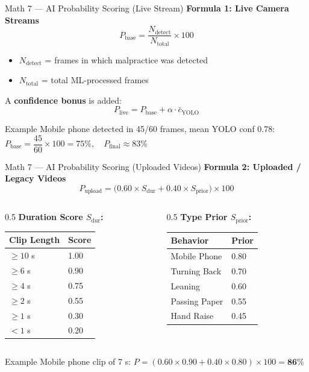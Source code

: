 \documentclass{beamer}
\begin{document}
\begin{frame}{Math 7 --- AI Probability Scoring (Live Stream)}
\textbf{Formula 1: Live Camera Streams}
\[ P_{\text{base}} = \frac{N_{\text{detect}}}{N_{\text{total}}} \times 100 \]
\begin{itemize}
    \item $N_{\text{detect}}$ = frames in which malpractice was detected
    \item $N_{\text{total}}$ = total ML-processed frames
\end{itemize}
A \textbf{confidence bonus} is added:
\[ \boxed{P_{\text{live}} = P_{\text{base}} + \alpha \cdot \bar{c}_{\text{YOLO}}} \]
\begin{exampleblock}{Example}
Mobile phone detected in 45/60 frames, mean YOLO conf 0.78:\\
$P_{\text{base}} = \dfrac{45}{60} \times 100 = 75\%,\quad P_{\text{final}} \approx 83\%$
\end{exampleblock}
\end{frame}

\begin{frame}{Math 7 --- AI Probability Scoring (Uploaded Videos)}
\textbf{Formula 2: Uploaded / Legacy Videos}
\[ \boxed{P_{\text{upload}} = \bigl(0.60\times S_{\text{dur}} + 0.40\times S_{\text{prior}}\bigr)\times 100} \]
\begin{columns}
\begin{column}{0.5\textwidth}
\footnotesize \textbf{Duration Score $S_{\text{dur}}$:}
\begin{tabular}{ll}
\toprule
Clip Length & Score \\ \midrule
$\geq10$ s & 1.00 \\ $\geq6$ s & 0.90 \\ $\geq4$ s & 0.75 \\ $\geq2$ s & 0.55 \\ $\geq1$ s & 0.30 \\ $<1$ s & 0.20 \\
\bottomrule
\end{tabular}
\end{column}
\begin{column}{0.5\textwidth}
\footnotesize \textbf{Type Prior $S_{\text{prior}}$:}
\begin{tabular}{ll}
\toprule
Behavior & Prior \\ \midrule
Mobile Phone & 0.80 \\ Turning Back & 0.70 \\ Leaning & 0.60 \\ Passing Paper & 0.55 \\ Hand Raise & 0.45 \\
\bottomrule
\end{tabular}
\end{column}
\end{columns}
\vspace{0.3cm}
\begin{exampleblock}{Example}
Mobile phone clip of 7 s: $P = (0.60\times0.90 + 0.40\times0.80)\times100 = \mathbf{86\%}$
\end{exampleblock}
\end{frame}
\end{document}
